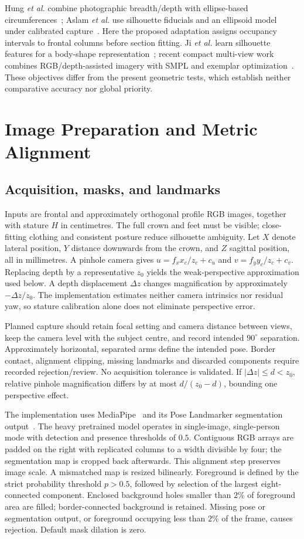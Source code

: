 \documentclass[11pt,a4paper]{article}
\begin{document}
Hung \emph{et al.} combine photographic breadth/depth with ellipse-based circumferences~\cite{hung2004}; Aslam \emph{et al.} use silhouette fiducials and an ellipsoid model under calibrated capture~\cite{aslam2017}. Here the proposed adaptation assigns occupancy intervals to frontal columns before section fitting. Ji \emph{et al.} learn silhouette features for a body-shape representation~\cite{ji2019}; recent compact multi-view work combines RGB/depth-assisted imagery with SMPL and exemplar optimization~\cite{chen2025compact}. These objectives differ from the present geometric tests, which establish neither comparative accuracy nor global priority.

\section{Image Preparation and Metric Alignment}
\subsection{Acquisition, masks, and landmarks}
Inputs are frontal and approximately orthogonal profile RGB images, together with stature $H$ in centimetres. The full crown and feet must be visible; close-fitting clothing and consistent posture reduce silhouette ambiguity. Let $X$ denote lateral position, $Y$ distance downwards from the crown, and $Z$ sagittal position, all in millimetres. A pinhole camera gives $u=f_xx_c/z_c+c_u$ and $v=f_yy_c/z_c+c_v$. Replacing depth by a representative $z_0$ yields the weak-perspective approximation used below. A depth displacement $\Delta z$ changes magnification by approximately $-\Delta z/z_0$. The implementation estimates neither camera intrinsics nor residual yaw, so stature calibration alone does not eliminate perspective error.

Planned capture should retain focal setting and camera distance between views, keep the camera level with the subject centre, and record intended $90^\circ$ separation. Approximately horizontal, separated arms define the intended pose. Border contact, alignment clipping, missing landmarks and discarded components require recorded rejection/review. No acquisition tolerance is validated. If $|\Delta z|\leq d<z_0$, relative pinhole magnification differs by at most $d/(z_0-d)$, bounding one perspective effect.

The implementation uses MediaPipe~\cite{lugaresi2019mediapipe} and its Pose Landmarker segmentation output~\cite{mediapipeguide}. The heavy pretrained model operates in single-image, single-person mode with detection and presence thresholds of $0.5$. Contiguous RGB arrays are padded on the right with replicated columns to a width divisible by four; the segmentation map is cropped back afterwards. This alignment step preserves image scale. A mismatched map is resized bilinearly. Foreground is defined by the strict probability threshold $p>0.5$, followed by selection of the largest eight-connected component. Enclosed background holes smaller than $2\%$ of foreground area are filled; border-connected background is retained. Missing pose or segmentation output, or foreground occupying less than $2\%$ of the frame, causes rejection. Default mask dilation is zero.
\end{document}
